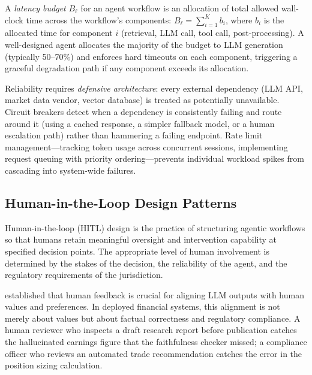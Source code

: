 \begin{context}
\begin{definition}
\label{def:latency-budget}
A \emph{latency budget} $B_\ell$ for an agent workflow is an allocation of total
allowed wall-clock time across the workflow's components:
$B_\ell = \sum_{i=1}^{K} b_i$, where $b_i$ is the allocated time for component $i$
(retrieval, LLM call, tool call, post-processing). A well-designed agent allocates
the majority of the budget to LLM generation (typically 50--70\%) and enforces hard
timeouts on each component, triggering a graceful degradation path if any component
exceeds its allocation.
\end{definition}

Reliability requires \emph{defensive architecture}: every external dependency (LLM
API, market data vendor, vector database) is treated as potentially unavailable.
Circuit breakers detect when a dependency is consistently failing and route around it
(using a cached response, a simpler fallback model, or a human escalation path) rather
than hammering a failing endpoint. Rate limit management---tracking token usage across
concurrent sessions, implementing request queuing with priority ordering---prevents
individual workload spikes from cascading into system-wide failures.


\subsection{Human-in-the-Loop Design Patterns}
\label{subsec:hitl}

Human-in-the-loop (HITL) design is the practice of structuring agentic workflows so
that humans retain meaningful oversight and intervention capability at specified
decision points. The appropriate level of human involvement is determined by the
stakes of the decision, the reliability of the agent, and the regulatory requirements
of the jurisdiction.

\citet{ouyang2022training} established that human feedback is crucial for aligning
LLM outputs with human values and preferences. In deployed financial systems, this
alignment is not merely about values but about factual correctness and regulatory
compliance. A human reviewer who inspects a draft research report before publication
catches the hallucinated earnings figure that the faithfulness checker missed; a
compliance officer who reviews an automated trade recommendation catches the error
in the position sizing calculation.


\end{context}
